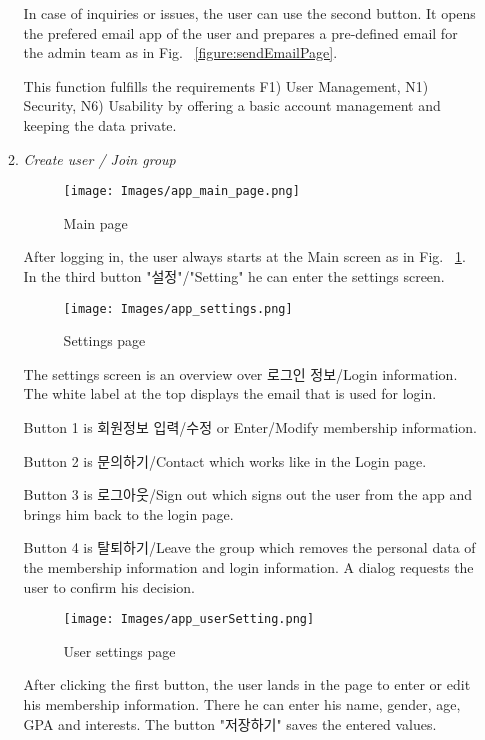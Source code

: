 \documentclass[conference]{IEEEtran}
\begin{document}
\begin{enumerate}
\begin{enumerate}
    


In case of inquiries or issues, the user can use the second button. It opens the prefered email app of the user and prepares a pre-defined email for the admin team as in Fig. ~\ref{figure:sendEmailPage}.

This function fulfills the requirements F1) User Management, N1) Security, N6) Usability by offering a basic account management and keeping the data private.\\
    
    \item \textit{Create user / Join group}
        
        \begin{figure}[htp]
    \centering
    \texttt{[image: Images/app\_main\_page.png]}
    \caption{Main page}
    \label{figure:mainPage}
\end{figure}
    
    After logging in, the user always starts at the Main screen as in Fig. ~\ref{figure:mainPage}. In the third button "설정"/"Setting" he can enter the settings screen.
    
    \begin{figure}[htp]
    \centering
    \texttt{[image: Images/app\_settings.png]}
    \caption{Settings page}
\end{figure}

The settings screen is an overview over 로그인 정보/Login information. The white label at the top displays the email that is used for login.

Button 1 is 회원정보 입력/수정 or Enter/Modify membership information.

Button 2 is 문의하기/Contact which works like in the Login page.

Button 3 is 로그아웃/Sign out which signs out the user from the app and brings him back to the login page.

Button 4 is 탈퇴하기/Leave the group which removes the personal data of the membership information and login information. A dialog requests the user to confirm his decision.


        \begin{figure}[htp]
    \centering
    \texttt{[image: Images/app\_userSetting.png]}
    \caption{User settings page}
\end{figure}
    
    After clicking the first button, the user lands in the page to enter or edit his membership information. There he can enter his name, gender, age, GPA and interests. The button "저장하기" saves the entered values.


\end{enumerate}
\end{enumerate}
\end{document}
